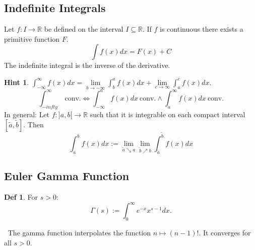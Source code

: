 \documentclass[a4paper, 10pt]{article}
\theoremstyle{definition}
\newtheorem*{definition}{Def}
\newtheorem*{note_wrapper}{Hint}
\theoremstyle{named}
\newenvironment{note}%
    {\begin{mdframed}[style=trick]\begin{note_wrapper}}%
    {\end{note_wrapper}\end{mdframed}}
\newcommand{\R}{\mathbb{R}}
\begin{document}
\subsection{Indefinite Integrals}
Let $f: I \to \R$ be defined on the interval $I \subseteq \R$. If $f$ is continuous there exists a primitive function $F$.
$$\int f(x) dx = F(x) + C$$
The indefinite integral is the inverse of the derivative.

\begin{note}
    $\int_{-\infty}^\infty f(x) dx = \lim\limits_{b \to - \infty} \int_b^a f(x) dx + \lim\limits_{c \to \infty} \int_a^c f(x) dx$.
    $$\int_{-infty}^\infty \ \text{conv.} \iff \int_{-\infty}^a f(x) dx \ \text{conv.} \land \int_a^\infty f(x) dx \ \text{conv.}$$
    In general: Let $f: ]a, b[ \to \R$ such that it is integrable on each compact interval $[\tilde{a}, \tilde{b}]$. Then 
    $$\int_a^b f(x) dx := \lim\limits_{\tilde{a} \searrow a}\lim\limits_{\tilde{b} \nearrow b} \int_{\tilde{a}}^{\tilde{b}} f(x) dx$$
\end{note}

\subsection{Euler Gamma Function}
\begin{definition}
    For $s > 0$:
    $$\Gamma(s) := \int_0^\infty e^{-x}x^{s - 1} dx.$$
\end{definition}
$\ $ \newline The gamma function interpolates the function $n \mapsto (n-1)!$. It converges for all $s > 0$.
\end{document}
